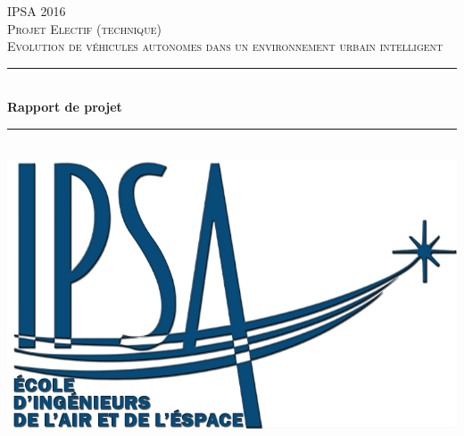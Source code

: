 \begin{titlepage}

\newcommand{\HRule}{\rule{\linewidth}{0.5mm}} %

\center %
 

\textsc{\LARGE IPSA 2016}\\[1.5cm] %
\textsc{\Large Projet Electif (technique)}\\[0.5cm] %
\textsc{\large Evolution de véhicules autonomes dans un environnement urbain intelligent}\\[0.5cm] %


\HRule \\[0.4cm]
{ \huge \bfseries Rapport de projet}\\[0.4cm] %
\HRule \\[4cm]



\includegraphics{Graphics/logo.png}\\[2.5cm] %
 

\end{titlepage}
